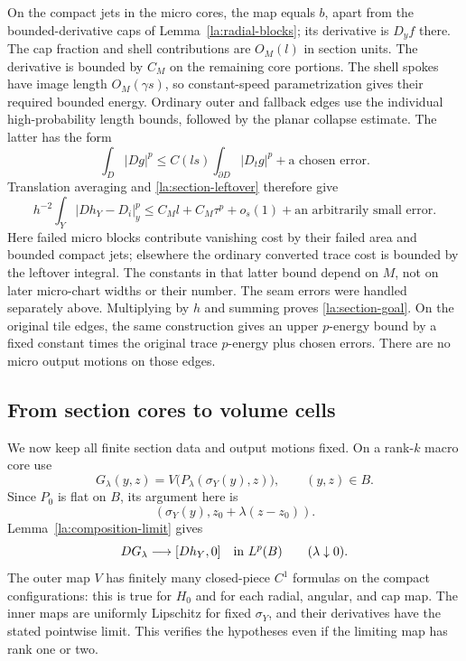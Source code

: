 \documentclass[11pt]{article}
\numberwithin{equation}{section}
\theoremstyle{definition}
\theoremstyle{remark}
\begin{document}
On the compact jets in the micro cores, the map equals $b$, apart
from the bounded-derivative caps of Lemma~\ref{la:radial-blocks}; its
derivative is $D_yf$ there.  The cap fraction and shell contributions
are $O_M(l)$ in section units.  The derivative is bounded by $C_M$
on the remaining core portions.  The shell spokes have image length
$O_M(\gamma s)$, so constant-speed parametrization gives their
required bounded energy.  Ordinary outer and fallback edges use the
individual high-probability length bounds, followed by the planar
collapse estimate.  The latter has the form
\[
 \int_D|Dg|^p
       \le C(ls)\int_{\partial D}|D_tg|^p+\text{a chosen error}.
\]
Translation averaging and \eqref{la:section-leftover} therefore give
\begin{equation}\label{la:micro-section-error}
 h^{-2}\int_Y|Dh_Y-D_i|_y^p
       \le C_M l+C_M\tau^p+o_s(1)
                 +\text{an arbitrarily small error}.
\end{equation}
Here failed micro blocks contribute vanishing cost by their failed
area and bounded compact jets; elsewhere the ordinary converted
trace cost is bounded by the leftover integral.  The constants in
that latter bound depend on $M$, not on later micro-chart widths or
their number.  The seam errors were handled separately above.
Multiplying by $h$ and summing proves \eqref{la:section-goal}.
On the original tile edges, the same construction gives an upper
$p$-energy bound by a fixed constant times the original trace
$p$-energy plus chosen errors.  There are no micro output motions
on those edges.

\subsection{From section cores to volume cells}

We now keep all finite section data and output motions fixed.  On a
rank-$k$ macro core use
\begin{equation}\label{la:kernel-core-map}
 G_\lambda(y,z)
   =V\bigl(P_\lambda(\sigma_Y(y),z)\bigr),\qquad(y,z)\in B.
\end{equation}
Since $P_0$ is flat on $B$, its argument here is
\[
 (\sigma_Y(y),z_0+\lambda(z-z_0)).
\]
Lemma~\ref{la:composition-limit} gives
\begin{equation}\label{la:kernel-core-limit}
 DG_\lambda\longrightarrow[Dh_Y,0]
       \quad\hbox{in }L^p(B)\qquad(\lambda\downarrow0).
\end{equation}
The outer map $V$ has finitely many closed-piece $C^1$ formulas on
the compact configurations: this is true for $H_0$ and for each
radial, angular, and cap map.  The inner maps are uniformly Lipschitz
for fixed $\sigma_Y$, and their derivatives have the stated pointwise
limit.  This verifies the hypotheses even if the limiting map has
rank one or two.
\end{document}
